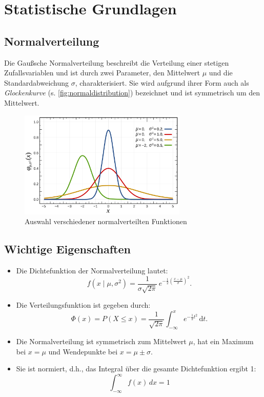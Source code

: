 \section{Statistische Grundlagen}
\label{sec:statistische_grundlagen}

\subsection{Normalverteilung}
\label{sec:normal_distribution}
Die Gaußsche Normalverteilung beschreibt die Verteilung einer stetigen Zufallsvariablen und ist durch zwei Parameter, den Mittelwert $\mu$ und die Standardabweichung $\sigma$, charakterisiert. Sie wird aufgrund ihrer Form auch als \textit{Glockenkurve} (s. \autoref{fig:normaldistribution}) bezeichnet und ist symmetrisch um den Mittelwert.
\begin{figure}[h]
    \centering
    \includegraphics[width=8cm]{Bilder/normal_distribution.png}
    \caption{
        Auswahl verschiedener normalverteilten Funktionen \cite{normaldistribution}}    
    \label{fig:normaldistribution}
\end{figure}
\subsection*{Wichtige Eigenschaften}
\begin{itemize}
    \item Die Dichtefunktion der Normalverteilung lautet:
    \[
    f(x \mid \mu, \sigma^2) = \frac{1}{\sigma \sqrt{2 \pi}} \, e^{-\frac{1}{2} \left( \frac{x - \mu}{\sigma} \right)^2}.
    \]
    \item Die Verteilungsfunktion ist gegeben durch:
    \[
    \Phi(x) = P(X \leq x) = \frac{1}{\sqrt{2 \pi}} \int_{-\infty}^{x} e^{-\frac{1}{2} t^2} \, \mathrm{d}t.
    \]
    \item Die Normalverteilung ist symmetrisch zum Mittelwert $\mu$, hat ein Maximum bei $x = \mu$ und Wendepunkte bei $x = \mu \pm \sigma$.
    \item Sie ist normiert, d.h., das Integral über die gesamte Dichtefunktion ergibt 1:
    \[
    \int_{-\infty}^{\infty} f(x) \, dx = 1
    \]
\end{itemize}

